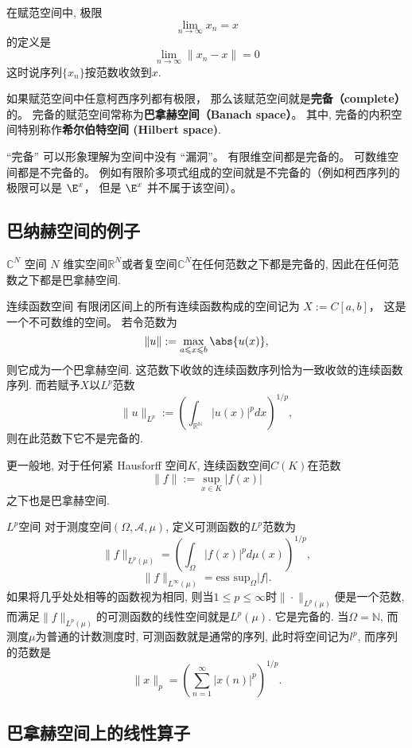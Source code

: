 
在赋范空间中, 极限
\begin{equation}
\lim_{n\to\infty} x_n = x
\end{equation}
的定义是
\begin{equation}
\lim_{n\to\infty} \|{x_n - x}\|= 0
\end{equation}
这时说序列$\{x_n\}$按范数收敛到$x$.

如果赋范空间中任意柯西序列都有极限， 那么该赋范空间就是\textbf{完备（complete）}的。 完备的赋范空间常称为\textbf{巴拿赫空间（Banach space）}。 其中, 完备的内积空间特别称作\textbf{希尔伯特空间 (Hilbert space)}.

“完备” 可以形象理解为空间中没有 “漏洞”。 有限维空间都是完备的。 可数维空间都是不完备的。 例如有限阶多项式组成的空间就是不完备的（例如柯西序列的极限可以是 $\E^x$， 但是 $\E^x$ 并不属于该空间）。

\subsection{巴纳赫空间的例子}
\begin{example}{$\mathbb C^N$ 空间}
$N$ 维实空间$\mathbb R^N$或者复空间$\mathbb C^N$在任何范数之下都是完备的, 因此在任何范数之下都是巴拿赫空间.
\end{example}

\begin{example}{连续函数空间}
有限闭区间上的所有连续函数构成的空间记为 $X := C[a, b]$， 这是一个不可数维的空间。 若令范数为
$$
\|{u}\|:= \max_{a \leqslant x \leqslant b} \abs{u(x)},
$$
则它成为一个巴拿赫空间. 这范数下收敛的连续函数序列恰为一致收敛的连续函数序列. 而若赋予$X$以$L^p$范数
$$
\|u\|_{L^p}:=\left(\int_{\mathbb{R^N}}|u(x)|^pdx\right)^{1/p},
$$
则在此范数下它不是完备的.

更一般地, 对于任何紧 Hausforff 空间$K$, 连续函数空间$C(K)$在范数
$$
\|f\|:=\sup_{x\in K}|f(x)|
$$
之下也是巴拿赫空间.
\end{example}

\begin{example}{$L^p$空间}
对于测度空间$(\Omega,\mathcal{A},\mu)$, 定义可测函数的$L^p$范数为
$$
\|f\|_{L^p(\mu)}=\left(\int_\Omega |f(x)|^pd\mu(x)\right)^{1/p},
$$
$$
\|f\|_{L^\infty(\mu)}=\text{ess sup}_{\Omega}|f|.
$$
如果将几乎处处相等的函数视为相同, 则当$1\leq p\leq\infty$时$\|\cdot\|_{L^p(\mu)}$便是一个范数, 而满足$\|f\|_{L^p(\mu)}$的可测函数的线性空间就是$L^p(\mu)$. 它是完备的. 当$\Omega=\mathbb{N}$, 而测度$\mu$为普通的计数测度时, 可测函数就是通常的序列, 此时将空间记为$l^p$, 而序列的范数是
$$
\|x\|_p=\left(\sum_{n=1}^\infty|x(n)|^p\right)^{1/p}.
$$
\end{example}

\subsection{巴拿赫空间上的线性算子}
